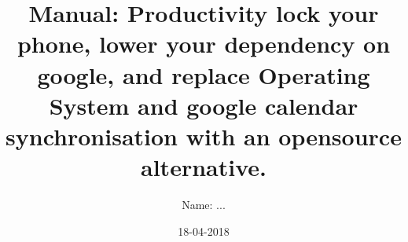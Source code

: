 \documentclass{article}
\title{Manual: Productivity lock your phone, lower your dependency on google, and replace Operating System and google calendar synchronisation with an opensource alternative.}
\author{Name: ...}
\date{18-04-2018}
\begin{document}
\maketitle
\tableofcontents
 
 
 
 
 
 
 
 
 
 
 
 



 \newpage

\begin{appendices}
\end{appendices}
\appendix








\end{document}

